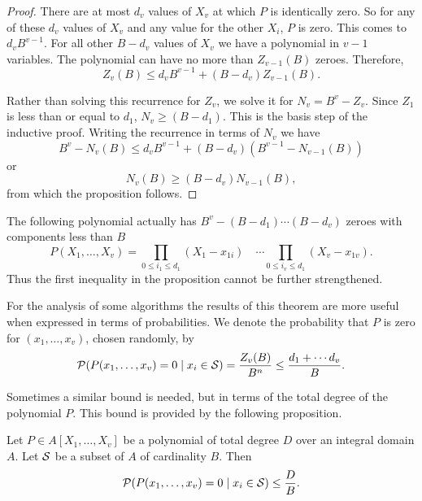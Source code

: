 \begin{proof}
There are at most $d_v$ values of $X_v$ at which $P$ is identically
zero.  So for any of these $d_v$ values of $X_v$ and any value for the
other $X_i$, $P$ is zero.  This comes to $d_vB^{v-1}$.  For all other
$B-d_v$ values of $X_v$ we have a polynomial in $v-1$ variables.  The
polynomial can have no more than $Z_{v-1}(B)$ zeroes.  Therefore,
\[
Z_v(B) \le d_v B^{v-1} + (B - d_v) Z_{v-1}(B).
\]

Rather than solving this recurrence for $Z_v$, we solve it for $N_v =
B^v - Z_v$.  Since $Z_1$ is less than or equal to $d_1$, $N_v \ge (B -
d_1)$.  This is the basis step of the inductive proof.  Writing the
recurrence in terms of $N_v$ we have
\[
B^v - N_v(B) \le d_v B^{v-1} + (B - d_v) (B^{v-1} - N_{v-1}(B))
\]
or
\[
N_v(B) \ge (B - d_v) N_{v-1}(B),
\]
from which the proposition follows. 
\end{proof}

The following polynomial actually has $B^v - (B-d_1) \cdots (B-d_v)$
zeroes with components less than $B$
\[
P(X_1, \ldots, X_v) =
\prod_{0 \le i_1 \le d_1}(X_1 - x_{1i}) \quad \cdots 
\prod_{0 \le i_v \le d_1}(X_v - x_{1v}).
\]
Thus the first inequality in the proposition cannot be further
strengthened.  

For the analysis of some algorithms the results of this theorem are
more useful when expressed in terms of probabilities.  We denote the
probability that $P$ is zero for $(x_1, \ldots, x_v)$, chosen randomly,
by
\[
{\cal P}(P(x_1, \ldots, x_v) = 0 \mid x_i \in {\cal S})
= \frac{Z_v(B)}{B^n} \le \frac{d_1 + \cdots d_v}{B}.
\]

Sometimes a similar bound is needed, but in terms of the total degree of
the polynomial $P$.  This bound
is provided by the following proposition.

\begin{proposition} \label{Prob:Total:Zero:Prop}
Let $P \in A[X_1, \ldots, X_v]$ be a polynomial of
total degree $D$ over an integral domain $A$.  Let ${\cal S}$ be a
subset of $A$ of cardinality $B$.  Then
\[
{\cal P}(P(x_1, \ldots, x_v)=0 \mid x_i \in {\cal S}) \le \frac{D}{B}.
\]
\end{proposition}

